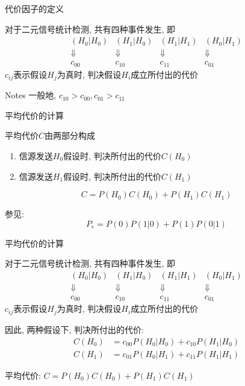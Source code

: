 \begin{frame}{代价因子的定义}
\begin{block}{对于二元信号统计检测, 共有四种事件发生, 即}
$$
\begin{array}{cccc}
	(H_0|H_0) & (H_1|H_0) & (H_1|H_1) & (H_0|H_1)\\
	\Downarrow & \Downarrow & \Downarrow & \Downarrow\\
	c_{00} & c_{10} & c_{11} & c_{01}
\end{array}
$$
$c_{ij}$表示假设$H_j$为真时, 判决假设$H_i$成立所付出的代价
\end{block}
\begin{block}{Notes}
	一般地, $c_{10}>c_{00}, c_{01}>c_{11}$
\end{block}
\end{frame}

\begin{frame}{平均代价的计算}
\begin{block}{平均代价$C$由两部分构成}
	\begin{enumerate}
		\item 信源发送$H_0$假设时, 判决所付出的代价$C(H_0)$
		\item 信源发送$H_1$假设时, 判决所付出的代价$C(H_1)$
	\end{enumerate}
    \[C=P(H_0)C(H_0)+P(H_1)C(H_1)\]
\end{block}
参见:
\[ P_e=P(0)P(1|0)+P(1)P(0|1)\]
\end{frame}

\begin{frame}{平均代价的计算}
\begin{block}{对于二元信号统计检测, 共有四种事件发生, 即}
	$$
	\begin{array}{cccc}
	(H_0|H_0) & (H_1|H_0) & (H_1|H_1) & (H_0|H_1)\\
	\Downarrow & \Downarrow & \Downarrow & \Downarrow\\
	c_{00} & c_{10} & c_{11} & c_{01}
	\end{array}
	$$
	$c_{ij}$表示假设$H_j$为真时, 判决假设$H_i$成立所付出的代价
\end{block}
\begin{block}{因此, 两种假设下, 判决所付出的代价: }
   \begin{align*}
   C(H_0)&=c_{00}P(H_0|H_0)+c_{10}P(H_1|H_0)\\
   C(H_1)&=c_{01}P(H_0|H_1)+c_{11}P(H_1|H_1)
   \end{align*}
\end{block}
 平均代价: $C=P(H_0)C(H_0)+P(H_1)C(H_1)$
\end{frame}

